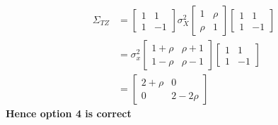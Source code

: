\documentclass{article}
\begin{document}
\begin{align*}
    \Sigma_{TZ} &= \begin{bmatrix}
   1   &   1\\
   1   &   -1
\end{bmatrix} \sigma_X^2 
\begin{bmatrix}
   1    & \rho \\
   \rho &  1 
\end{bmatrix}
\begin{bmatrix}
   1   &   1\\
   1   &   -1
\end{bmatrix}\\
&= \sigma_x^2 \begin{bmatrix}
    1 + \rho   &   \rho + 1\\
    1 - \rho   &    \rho - 1
\end{bmatrix} 
\begin{bmatrix}
   1   &   1\\
   1   &   -1
\end{bmatrix} \\&=
\begin{bmatrix}
   2+\rho    &     0\\
   0         &     2-2\rho
\end{bmatrix}
\end{align*}
\textbf{Hence option 4 is correct}
\end{document}
